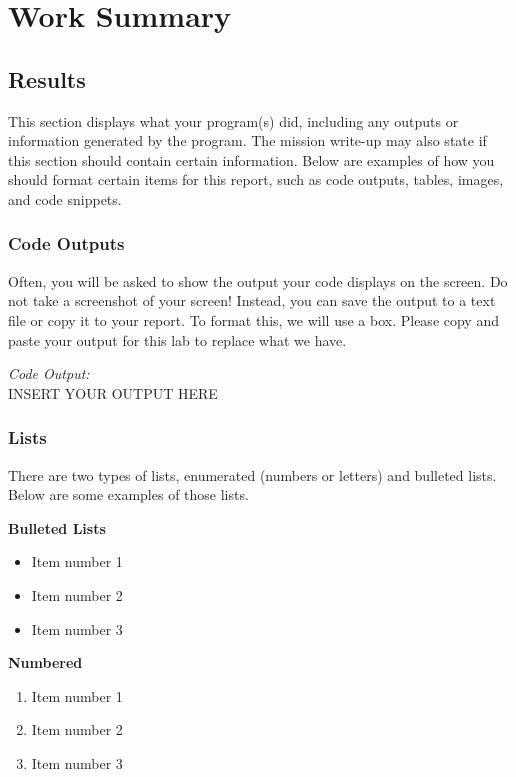 \documentclass{report}
\begin{document}
\chapter{Work Summary}

\section{Results}
This section displays what your program(s) did, including any outputs or information generated by the program. The mission write-up may also state if this section should contain certain information. Below are examples of how you should format certain items for this report, such as code outputs, tables, images, and code snippets.

\subsection{Code Outputs}
Often, you will be asked to show the output your code displays on the screen. Do not take a screenshot of your screen! Instead, you can save the output to a text file or copy it to your report. To format this, we will use a box. Please copy and paste your output for this lab to replace what we have.

\begin{tcolorbox}
\emph{Code Output:} \\
INSERT YOUR OUTPUT HERE
\end{tcolorbox}

\subsection{Lists}
There are two types of lists, enumerated (numbers or letters) and bulleted lists. Below are some examples of those lists.

\textbf{Bulleted Lists}
\begin{itemize}
    \item Item number 1
    \item Item number 2
    \item Item number 3
\end{itemize}

\textbf{Numbered}
\begin{enumerate}
    \item Item number 1
    \item Item number 2
    \item Item number 3
\end{enumerate}
\end{document}
